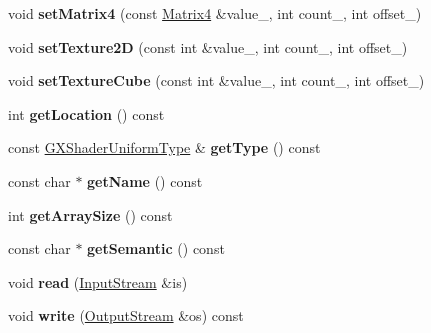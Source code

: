 \begin{DoxyCompactItemize}
\item 
void {\bfseries set\+Matrix4} (const \hyperlink{class_i_dream_sky_1_1_matrix4}{Matrix4} \&value\+\_\+, int count\+\_, int offset\+\_)\hypertarget{class_i_dream_sky_1_1_g_x_uniform_a5e7d4f55bd0931c06419c3f202770da4}{}\label{class_i_dream_sky_1_1_g_x_uniform_a5e7d4f55bd0931c06419c3f202770da4}

\item 
void {\bfseries set\+Texture2D} (const int \&value\+\_\+, int count\+\_, int offset\+\_)\hypertarget{class_i_dream_sky_1_1_g_x_uniform_ab985f7fe637522cc76debab09e663939}{}\label{class_i_dream_sky_1_1_g_x_uniform_ab985f7fe637522cc76debab09e663939}

\item 
void {\bfseries set\+Texture\+Cube} (const int \&value\+\_\+, int count\+\_, int offset\+\_)\hypertarget{class_i_dream_sky_1_1_g_x_uniform_ae07b28cb3631f86026dd3a152e8e2603}{}\label{class_i_dream_sky_1_1_g_x_uniform_ae07b28cb3631f86026dd3a152e8e2603}

\item 
int {\bfseries get\+Location} () const \hypertarget{class_i_dream_sky_1_1_g_x_uniform_a2210193704566baea9a7238427a80fa6}{}\label{class_i_dream_sky_1_1_g_x_uniform_a2210193704566baea9a7238427a80fa6}

\item 
const \hyperlink{class_i_dream_sky_1_1_g_x_shader_uniform_type}{G\+X\+Shader\+Uniform\+Type} \& {\bfseries get\+Type} () const \hypertarget{class_i_dream_sky_1_1_g_x_uniform_ab20b6c510f128968eede2a79f1793307}{}\label{class_i_dream_sky_1_1_g_x_uniform_ab20b6c510f128968eede2a79f1793307}

\item 
const char $\ast$ {\bfseries get\+Name} () const \hypertarget{class_i_dream_sky_1_1_g_x_uniform_aa9191ea4a2e3942f0167f1d415804352}{}\label{class_i_dream_sky_1_1_g_x_uniform_aa9191ea4a2e3942f0167f1d415804352}

\item 
int {\bfseries get\+Array\+Size} () const \hypertarget{class_i_dream_sky_1_1_g_x_uniform_a710c2a0c3976b393fd2889874d7fba6a}{}\label{class_i_dream_sky_1_1_g_x_uniform_a710c2a0c3976b393fd2889874d7fba6a}

\item 
const char $\ast$ {\bfseries get\+Semantic} () const \hypertarget{class_i_dream_sky_1_1_g_x_uniform_afb33ee50a874ec6d6dbe5bc022b28349}{}\label{class_i_dream_sky_1_1_g_x_uniform_afb33ee50a874ec6d6dbe5bc022b28349}

\item 
void {\bfseries read} (\hyperlink{class_i_dream_sky_1_1_input_stream}{Input\+Stream} \&is)\hypertarget{class_i_dream_sky_1_1_g_x_uniform_af9feed7e9cf196e98b432cfc3419208d}{}\label{class_i_dream_sky_1_1_g_x_uniform_af9feed7e9cf196e98b432cfc3419208d}

\item 
void {\bfseries write} (\hyperlink{class_i_dream_sky_1_1_output_stream}{Output\+Stream} \&os) const \hypertarget{class_i_dream_sky_1_1_g_x_uniform_a962751706993617a55fd2c9cc08caa09}{}\label{class_i_dream_sky_1_1_g_x_uniform_a962751706993617a55fd2c9cc08caa09}

\end{DoxyCompactItemize}
